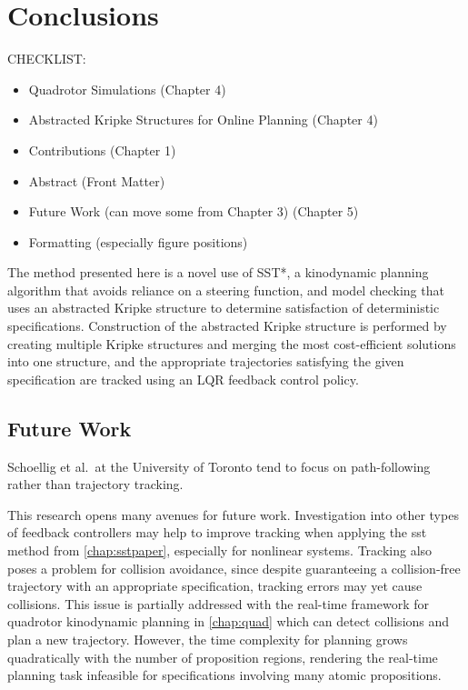 
\chapter{Conclusions}\label{chap:conc}



CHECKLIST:\\
\begin{itemize}
    \item Quadrotor Simulations (Chapter 4)
    \item Abstracted Kripke Structures for Online Planning (Chapter 4)
    \item Contributions (Chapter 1)
    \item Abstract (Front Matter)
    \item Future Work (can move some from Chapter 3) (Chapter 5)
    \item Formatting (especially figure positions)
\end{itemize}


The method presented here is a novel use of SST*, a kinodynamic planning algorithm that avoids reliance on a steering function, and \mucalc{} model checking that uses an abstracted Kripke structure to determine satisfaction of deterministic \mucalc{} specifications. Construction of the abstracted Kripke structure is performed by creating multiple Kripke structures and merging the most cost-efficient solutions into one structure, and the appropriate trajectories satisfying the given specification are tracked using an LQR feedback control policy.





\section{Future Work}

Schoellig et al.\ at the University of Toronto tend to focus on path-following rather than trajectory tracking.

This research opens many avenues for future work. Investigation into other types of feedback controllers may help to improve tracking when applying the \gls{sst} method from \autoref{chap:sstpaper}, especially for nonlinear systems. Tracking also poses a problem for collision avoidance, since despite guaranteeing a collision-free trajectory with an appropriate \mucalc{} specification, tracking errors may yet cause collisions. This issue is partially addressed with the real-time framework for quadrotor kinodynamic planning in \autoref{chap:quad} which can detect collisions and plan a new trajectory. However, the time complexity for planning grows quadratically with the number of proposition regions, rendering the real-time planning task infeasible for specifications involving many atomic propositions.

